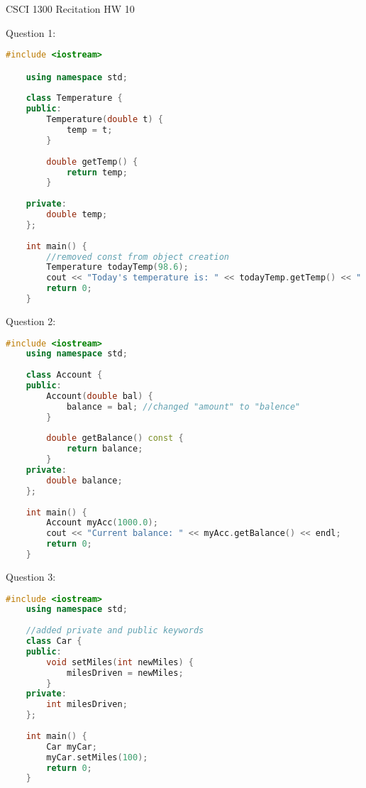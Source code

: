 \documentclass{article}
\begin{document}
CSCI 1300 Recitation HW 10

\vspace{1cm}

Question 1:

\begin{lstlisting}[language=C++]
    #include <iostream>

    using namespace std;
    
    class Temperature {
    public:
        Temperature(double t) { 
            temp = t; 
        }
    
        double getTemp() { 
            return temp; 
        }
    
    private:
        double temp;
    };
    
    int main() {
        //removed const from object creation
        Temperature todayTemp(98.6);
        cout << "Today's temperature is: " << todayTemp.getTemp() << " degrees." << endl;
        return 0;
    }    
\end{lstlisting}

\vspace{1cm}

Question 2:

\begin{lstlisting}[language=C++]
    #include <iostream>
    using namespace std;
    
    class Account {
    public:
        Account(double bal) {
            balance = bal; //changed "amount" to "balence"
        }
    
        double getBalance() const {
            return balance;
        }   
    private:
        double balance;
    };
    
    int main() {
        Account myAcc(1000.0);
        cout << "Current balance: " << myAcc.getBalance() << endl;
        return 0;
    }    
\end{lstlisting}

\vspace{1cm}

Question 3:

\begin{lstlisting}[language=C++]
    #include <iostream>
    using namespace std;
    
    //added private and public keywords
    class Car {
    public:
        void setMiles(int newMiles) {
            milesDriven = newMiles;
        }
    private:
        int milesDriven;
    };
    
    int main() {
        Car myCar;
        myCar.setMiles(100);
        return 0;
    }    
\end{lstlisting}
\end{document}
